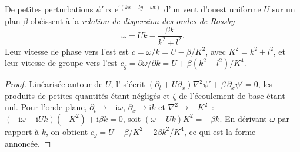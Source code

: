 \begin{theorem}\label{thm:b3:atmospheric-dynamics:rossby}
De petites perturbations $\psi' \propto \mathrm e^{\mathrm i(kx + ly - \omega t)}$
d'un vent d'ouest uniforme $U$ sur un plan $\beta$ obéissent à la
\emph{relation de dispersion des ondes de Rossby}
\[
\omega = Uk - \frac{\beta k}{k^2 + l^2} .
\]
Leur vitesse de phase vers l'est est $c = \omega/k = U - \beta/K^2$, avec $K^2 =
k^2 + l^2$, et leur vitesse de groupe vers l'est $c_g = \partial\omega/\partial
k = U + \beta(k^2 - l^2)/K^4$.
\end{theorem}

\begin{proof}
Linéarisée autour de $U$, l' s'écrit
$(\partial_t + U\partial_x)\nabla^2\psi' + \beta\,\partial_x\psi' = 0$, les
produits de petites quantités étant négligés et $\zeta$ de l'écoulement de base
étant nul. Pour l'onde plane, $\partial_t \to -\mathrm i\omega$,
$\partial_x \to \mathrm ik$ et $\nabla^2 \to -K^2$~: $(-\mathrm i\omega +
\mathrm iUk)(-K^2) + \mathrm i\beta k = 0$, soit $(\omega - Uk)K^2 =
-\beta k$. En dérivant $\omega$ par rapport à $k$, on obtient $c_g = U -
\beta/K^2 + 2\beta k^2/K^4$, ce qui est la forme annoncée.
\end{proof}

